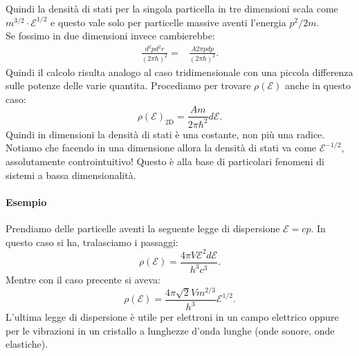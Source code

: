 Quindi la densità di stati per la singola particella in tre dimensioni scala come $ m ^{3 /2} \cdot  \mathcal{E}^{1 /2}$ e questo vale solo per particelle massive aventi l'energia $p^2 /2m$. \\
Se fossimo in due dimensioni invece cambierebbe:
\begin{align}
	\frac{d^2p d^2r}{\left( 2\pi \hbar  \right)^2} =& \frac{A 2\pi p dp}{\left( 2\pi \hbar \right)^2 }
.\end{align}
Quindi il calcolo risulta analogo al caso tridimensionale con una piccola differenza sulle potenze delle varie quantita. Procediamo per trovare $\rho\left( \mathcal{E} \right)$ anche in questo caso:
\[
	\rho\left( \mathcal{E} \right) _{\text{2D}} = \frac{Am}{2\pi \hbar^2} d\mathcal{E}
.\] 
Quindi in dimensioni la densità di stati è una costante, non più una radice. \\
Notiamo che facendo in una dimensione allora la densità di stati va come $\mathcal{E}^{-1 /2}$, assolutamente controintuitivo! Questo è alla base di particolari fenomeni di sistemi a bassa dimensionalità.

\paragraph{Esempio}%
Prendiamo delle particelle aventi la seguente legge di dispersione $\mathcal{E} = c p$. In questo caso si ha, tralasciamo i passaggi:
\[
	\rho\left( \mathcal{E} \right) = \frac{4\pi V \mathcal{E}^2d\mathcal{E}}{h^3 c^3}
.\] 
Mentre con il caso precente si aveva:
\[
	\rho\left( \mathcal{E} \right) = \frac{4\pi \sqrt{2} V m ^{2 /3}}{h^3} \mathcal{E}^{1 /2}
.\] 
L'ultima legge di dispersione è utile per elettroni in un campo elettrico oppure per le vibrazioni in un cristallo a lunghezze d'onda lunghe (onde sonore, onde elastiche).\\

